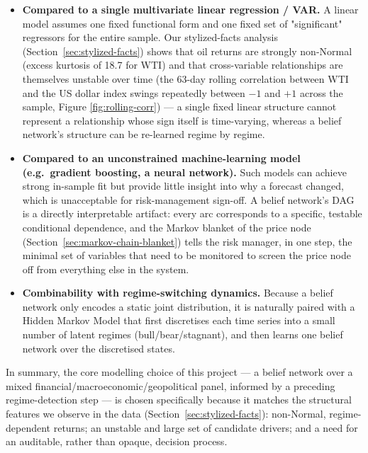 \begin{itemize}
  \item \textbf{Compared to a single multivariate linear regression / VAR.} A linear
    model assumes one fixed functional form and one fixed set of
    "significant" regressors for the entire sample. Our stylized-facts
    analysis (Section~\ref{sec:stylized-facts}) shows that oil returns are
    strongly non-Normal (excess kurtosis of 18.7 for WTI) and that
    cross-variable relationships are themselves unstable over time (the
    63-day rolling correlation between WTI and the US dollar index swings
    repeatedly between $-1$ and $+1$ across the sample, Figure
    \ref{fig:rolling-corr}) — a single fixed linear structure cannot represent a relationship whose sign itself is time-varying, whereas a belief network's structure can be re-learned regime by regime.
  \item \textbf{Compared to an unconstrained machine-learning model (e.g.\ gradient boosting, a neural network).} Such models can achieve strong in-sample fit but provide little insight into why a forecast changed, which is unacceptable for risk-management sign-off. A belief network's DAG is a directly interpretable artifact: every arc corresponds to a specific, testable conditional dependence, and the Markov blanket of the price node (Section~\ref{sec:markov-chain-blanket}) tells the risk manager, in one step, the minimal set of variables that need to be monitored to screen the price node off from everything else in the system.
  \item \textbf{Combinability with regime-switching dynamics.} Because a belief network only encodes a static joint distribution, it is naturally paired with a Hidden Markov Model that first discretises each time series into a small number of latent regimes (bull/bear/stagnant), and then learns one belief network over the discretised states. 
\end{itemize}

In summary, the core modelling choice of this project — a belief network over a mixed financial/macroeconomic/geopolitical panel, informed by a preceding regime-detection step — is chosen specifically because it matches the structural features we observe in the data (Section~\ref{sec:stylized-facts}):
non-Normal, regime-dependent returns; an unstable and large set of candidate
drivers; and a need for an auditable, rather than opaque, decision process.
